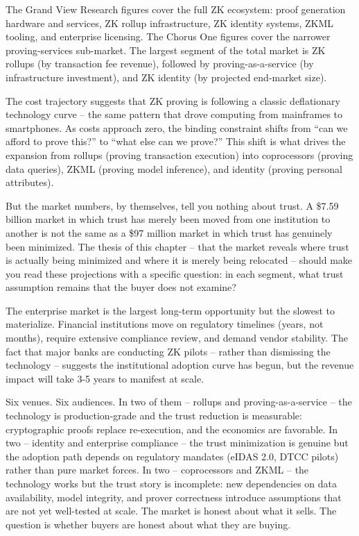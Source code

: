 \documentclass[
  11pt,
  openany]{report}
\begin{document}
The Grand View Research figures cover the full ZK ecosystem: proof generation
hardware and services, ZK rollup infrastructure, ZK identity systems, ZKML
tooling, and enterprise licensing. The Chorus One figures cover the narrower
proving-services sub-market. The largest segment of the total market is ZK
rollups (by transaction fee revenue), followed by proving-as-a-service (by
infrastructure investment), and ZK identity (by projected end-market size).

The cost trajectory suggests that ZK proving is following a classic deflationary
technology curve -- the same pattern that drove computing from mainframes to
smartphones. As costs approach zero, the binding constraint shifts from ``can we
afford to prove this?'' to ``what else can we prove?'' This shift is what drives
the expansion from rollups (proving transaction execution) into coprocessors
(proving data queries), ZKML (proving model inference), and identity (proving
personal attributes).

But the market numbers, by themselves, tell you nothing about trust. A \$7.59
billion market in which trust has merely been moved from one institution to
another is not the same as a \$97 million market in which trust has genuinely
been minimized. The thesis of this chapter -- that the market reveals where
trust is actually being minimized and where it is merely being relocated --
should make you read these projections with a specific question: in each
segment, what trust assumption remains that the buyer does not examine?

The enterprise market is the largest long-term opportunity but the slowest to
materialize. Financial institutions move on regulatory timelines (years, not
months), require extensive compliance review, and demand vendor stability. The
fact that major banks are conducting ZK pilots -- rather than dismissing the
technology -- suggests the institutional adoption curve has begun, but the
revenue impact will take 3-5 years to manifest at scale.

Six venues. Six audiences. In two of them -- rollups and proving-as-a-service --
the technology is production-grade and the trust reduction is measurable:
cryptographic proofs replace re-execution, and the economics are favorable. In
two -- identity and enterprise compliance -- the trust minimization is genuine
but the adoption path depends on regulatory mandates (eIDAS 2.0, DTCC pilots)
rather than pure market forces. In two -- coprocessors and ZKML -- the
technology works but the trust story is incomplete: new dependencies on data
availability, model integrity, and prover correctness introduce assumptions that
are not yet well-tested at scale. The market is honest about what it sells. The
question is whether buyers are honest about what they are buying.
\end{document}
